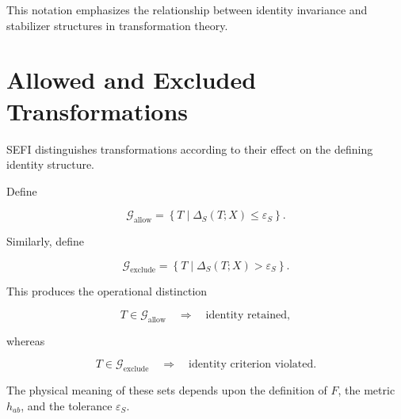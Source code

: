 \documentclass[12pt,oneside]{book}
\begin{document}
This notation emphasizes the relationship between identity
invariance and stabilizer structures in transformation theory.


\section{Allowed and Excluded Transformations}
\label{sec:allowed-excluded-transformations}

SEFI distinguishes transformations according to their effect on
the defining identity structure.

Define

\begin{equation}
    \mathcal{G}_{\mathrm{allow}}
    =
    \left\{
        T
        \mid
        \Delta_S(T;X)
        \leq
        \varepsilon_S
    \right\}.
    \label{eq:allowed-transformation-set}
\end{equation}

Similarly, define

\begin{equation}
    \mathcal{G}_{\mathrm{exclude}}
    =
    \left\{
        T
        \mid
        \Delta_S(T;X)
        >
        \varepsilon_S
    \right\}.
    \label{eq:excluded-transformation-set}
\end{equation}

This produces the operational distinction

\begin{equation}
    T
    \in
    \mathcal{G}_{\mathrm{allow}}
    \quad\Longrightarrow\quad
    \text{identity retained},
    \label{eq:allowed-retains-identity}
\end{equation}

whereas

\begin{equation}
    T
    \in
    \mathcal{G}_{\mathrm{exclude}}
    \quad\Longrightarrow\quad
    \text{identity criterion violated}.
    \label{eq:excluded-violates-identity}
\end{equation}

The physical meaning of these sets depends upon the definition
of \(F\), the metric \(h_{ab}\), and the tolerance
\(\varepsilon_S\).

\end{document}
